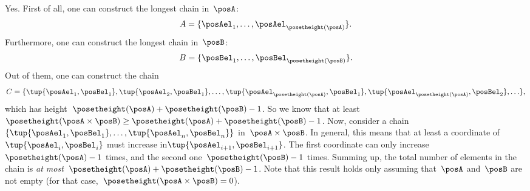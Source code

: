 \begin{solution}
  Yes. First of all, one can construct the longest chain in~$\posA$:
\begin{equation*}
  A=\{\posAel_1,\ldots, \posAel_{\posetheight(\posA)}\}.
\end{equation*}
  Furthermore, one can construct the longest chain in~$\posB$:
  \begin{equation*}
  B=\{\posBel_1,\ldots, \posBel_{\posetheight(\posB)}\}.
\end{equation*}
  Out of them, one can construct the chain
  \begin{equation*}
    C=\{ \tup{\posAel_1,\posBel_1},\tup{\posAel_2,\posBel_1},\ldots, \tup{\posAel_{\posetheight(\posA)}, \posBel_1}, \tup{\posAel_{\posetheight(\posA)}, \posBel_2},\ldots\},
  \end{equation*}
  which has height~$\posetheight(\posA)+\posetheight(\posB)-1$. So we know that at least~$\posetheight(\posA\times \posB)\geq \posetheight(\posA)+\posetheight(\posB)-1$.
  Now, consider a chain~$\{\tup{\posAel_1,\posBel_1},\ldots, \tup{\posAel_n,\posBel_n}\}$ in~$\posA\times \posB$.
  In general, this means that at least a coordinate of~$\tup{\posAel_{i},\posBel_{i}}$ must increase in$\tup{\posAel_{i+1},\posBel_{i+1}}$.
  The first coordinate can only increase~$\posetheight(\posA)-1$ times, and the second one~$\posetheight(\posB)-1$ times. Summing up, the total number of elements in the chain is \emph{at most}~$\posetheight(\posA)+\posetheight(\posB)-1$.
  Note that this result holds only assuming that~$\posA$ and~$\posB$ are not empty (for that case,~$\posetheight(\posA\times \posB)=0$).
\end{solution}

